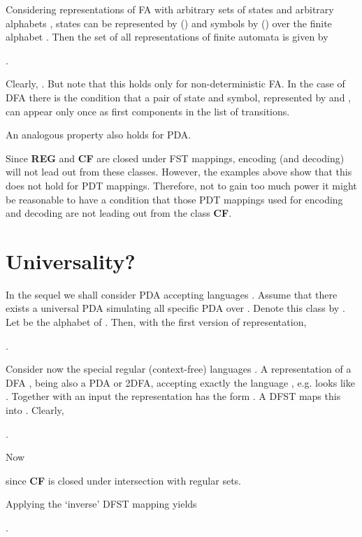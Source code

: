 \documentclass{eptcs}
\begin{document}
{{{\medskip

Considering representations of FA with arbitrary sets of states  and arbitrary
alphabets , states  can be represented by  () and symbols  by
 () over the finite alphabet . Then the set of all
representations of finite automata is given by

.

Clearly, . But note that this holds only for non-deterministic FA.
In the case of DFA there is the condition that a pair 
of state and symbol, represented by  and ,
can appear only once as first components in the list of transitions. 

An analogous property also holds for PDA.

\medskip

Since {\bf REG} and {\bf CF} are closed under FST mappings, encoding (and
decoding) will not lead out from these classes. However, the examples
above show that this does not hold for PDT mappings. Therefore, not to gain too
much power it might be reasonable to have a condition that those PDT mappings
used for encoding and decoding are not leading out from the class {\bf CF}.

\section{Universality?}

In the sequel we shall consider PDA  accepting languages .
Assume that there exists a universal PDA  simulating all specific PDA  over
. Denote this class by .
Let  be the alphabet of . Then, with the first version of
representation,

.

Consider now the special regular (context-free) languages .
A representation of a DFA , being also a PDA or 2DFA, accepting exactly
the language ,
e.g. looks like
\mbox{}.
Together with an input  the representation has the form
.
A DFST maps this into .
Clearly,



\hspace{.5cm}.

Now 



\hspace{1cm}

since {\bf CF} is closed under intersection with regular sets.

Applying the `inverse' DFST mapping  yields

.

}}}
\end{document}
